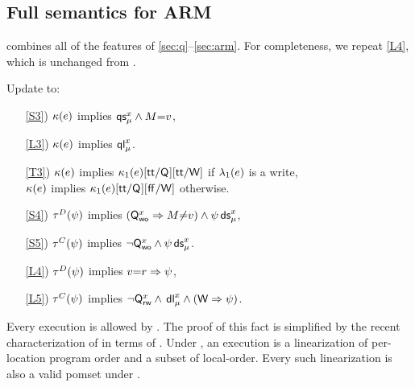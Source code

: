 \subsection{Full semantics for ARM}

 combines all of the features of
\textsection\ref{sec:q}--\ref{sec:arm}.  For completeness, we repeat
\ref{L4}, which is unchanged from .

\begin{definition}[$\xCO$/$\xRASC$/$\xDGR$/$\xRRD$]
  \label{def:pomsets-arm}
  Update  to:
  \begin{enumerate}
  \item[\ref{S3})]
    $\labelingForm(\aEv)$ implies $\QS{\aLoc}{\amode}\land\aExp{=}\aVal$,
  \item[\ref{L3})]
    $\labelingForm(\aEv)$ implies $\QL{\aLoc}{\amode}$.
  \item[\ref{T3})]
    $\labelingForm(\aEv)$ implies
    $\labelingForm_1(\aEv)[\TRUE/\Q{}][\TRUE/\RW]$ if $\labelingAct_1(\aEv)$ is a write,
    \\
    $\labelingForm(\aEv)$ implies
    $\labelingForm_1(\aEv)[\TRUE/\Q{}][\FALSE/\RW]$ otherwise.
  \end{enumerate}
  \begin{enumerate}
  \item[\ref{S4})]
    $\aTr{\bEvs}{\bForm}$ implies $(\Qw{\aLoc}\limplies\aExp{\neq}\aVal)\land \DS{\aLoc}{\amode}\bForm\noSUB{[\aExp/\aLoc]}$,
  \item[\ref{S5})]
    $\aTr{\cEvs}{\bForm}$ implies $\lnot\Qw{\aLoc}\land \DS{\aLoc}{\amode}\bForm\noSUB{[\aExp/\aLoc]}$.
  \item[\ref{L4})]
    $\aTr{\bEvs}{\bForm}$ implies $\aVal{=}\aReg\limplies\bForm$, 
  \item[\ref{L5})]
    $\aTr{\cEvs}{\bForm}$ implies $\lnot\Qx{\aLoc} \land \DL{\aLoc}{\amode}{}
    \land (\RW\limplies\bForm)$.
  \end{enumerate}  
\end{definition}

Every \armeight{} execution is allowed by .  The
proof of this fact is simplified by the recent characterization of
\armeight{} in terms of \EGC{} \cite[\textsection
B2.3.6]{arm-reference-manual}.  Under \EGC{}, an \armeight{} execution is a
linearization of per-location program order and a subset of local-order.
Every such linearization is also a valid pomset under
.


